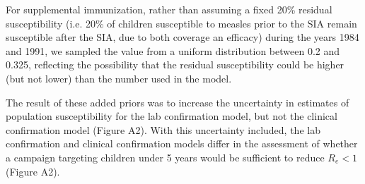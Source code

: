 For supplemental immunization, rather than assuming a fixed 20\% residual susceptibility (i.e. 20\% of children susceptible to measles prior to the SIA remain susceptible after the SIA, due to both coverage an efficacy) during the years 1984 and 1991, we sampled the value from a uniform distribution between 0.2 and 0.325, reflecting the possibility that the residual susceptibility could be higher (but not lower) than the number used in the model.

The result of these added priors was to increase the uncertainty in estimates of population susceptibility for the lab confirmation model, but not the clinical confirmation model (Figure A2). With this uncertainty included, the lab confirmation and clinical confirmation models differ in the assessment of whether a campaign targeting children under 5 years would be sufficient to reduce $R_e < 1$ (Figure A2). 